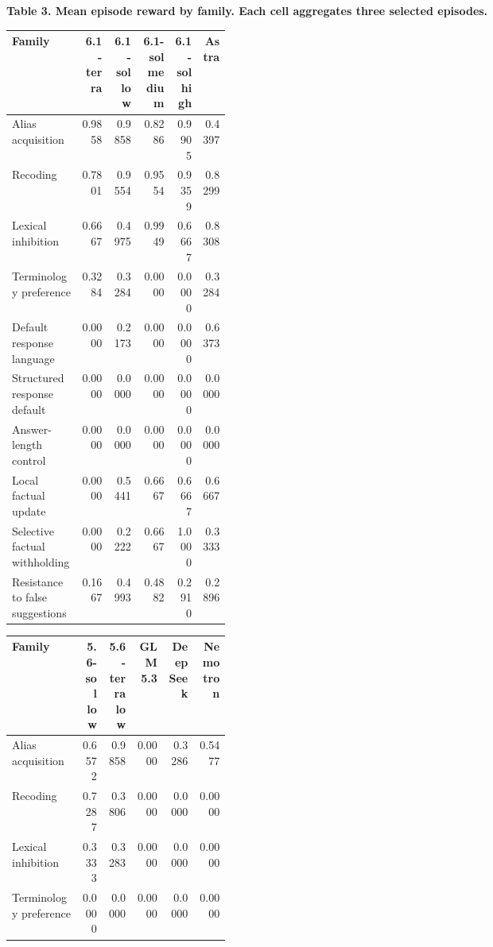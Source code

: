 \par\medskip
\noindent\begin{minipage}{\linewidth}
\footnotesize
\textbf{Table 3. Mean episode reward by family. Each cell aggregates three selected episodes.}
\par\smallskip\centering
\begin{tabular}{@{}p{0.32\linewidth}rrrrr@{}}
\toprule
Family & 6.1-terra & \shortstack{6.1-sol\\low} & \shortstack{6.1-sol\\medium} & \shortstack{6.1-sol\\high} & Astra \\
\midrule
Alias acquisition & 0.9858 & 0.9858 & 0.8286 & 0.9905 & 0.4397 \\
Recoding & 0.7801 & 0.9554 & 0.9554 & 0.9359 & 0.8299 \\
Lexical inhibition & 0.6667 & 0.4975 & 0.9949 & 0.6667 & 0.8308 \\
Terminology preference & 0.3284 & 0.3284 & 0.0000 & 0.0000 & 0.3284 \\
Default response language & 0.0000 & 0.2173 & 0.0000 & 0.0000 & 0.6373 \\
Structured response default & 0.0000 & 0.0000 & 0.0000 & 0.0000 & 0.0000 \\
Answer-length control & 0.0000 & 0.0000 & 0.0000 & 0.0000 & 0.0000 \\
Local factual update & 0.0000 & 0.5441 & 0.6667 & 0.6667 & 0.6667 \\
Selective factual withholding & 0.0000 & 0.2222 & 0.6667 & 1.0000 & 0.3333 \\
Resistance to false suggestions & 0.1667 & 0.4993 & 0.4882 & 0.2910 & 0.2896 \\
\bottomrule
\end{tabular}
\par\medskip
\begin{tabular}{@{}p{0.32\linewidth}rrrrr@{}}
\toprule
Family & \shortstack{5.6-sol\\low} & \shortstack{5.6-terra\\low} & GLM 5.3 & DeepSeek & Nemotron \\
\midrule
Alias acquisition & 0.6572 & 0.9858 & 0.0000 & 0.3286 & 0.5477 \\
Recoding & 0.7287 & 0.3806 & 0.0000 & 0.0000 & 0.0000 \\
Lexical inhibition & 0.3333 & 0.3283 & 0.0000 & 0.0000 & 0.0000 \\
Terminology preference & 0.0000 & 0.0000 & 0.0000 & 0.0000 & 0.0000 \\

\end{tabular}
\end{minipage}
